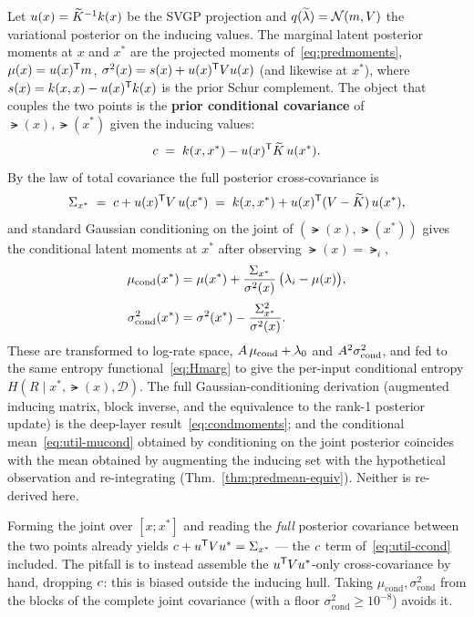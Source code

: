 Let $u(x)=\widetilde{K}^{-1}k(x)$ be the SVGP projection and $q(\widetilde{\lambda})=\mathcal{N}(m,V)$
the variational posterior on the inducing values. The marginal latent posterior
moments at $x$ and $x^{*}$ are the projected moments of~\eqref{eq:predmoments},
$\mu(x)=u(x)^{\mathsf{T}}m$, $\sigma^{2}(x)=s(x)+u(x)^{\mathsf{T}}Vu(x)$
(and likewise at $x^{*}$), where $s(x)=k(x,x)-u(x)^{\mathsf{T}}k(x)$ is
the prior Schur complement. The object that couples the two points is the
\textbf{prior conditional covariance} of $\lat(x),\lat(x^{*})$ given the inducing
values:
%
\begin{equation}
  c \;=\; k(x,x^{*}) - u(x)^{\mathsf{T}}\widetilde{K}\,u(x^{*}) .
  \label{eq:util-ccond}
\end{equation}
%
By the law of total covariance the full posterior cross-covariance is
%
\begin{equation}
  \Sigma_{x^{*}} \;=\; c + u(x)^{\mathsf{T}}V\,u(x^{*})
             \;=\; k(x,x^{*}) + u(x)^{\mathsf{T}}(V-\widetilde{K})\,u(x^{*}) ,
  \label{eq:util-crosscov}
\end{equation}
%
and standard Gaussian conditioning on the joint of
$(\lat(x),\lat(x^{*}))$ gives the conditional latent moments at $x^{*}$ after
observing $\lat(x)=\lat_i$,
%
\begin{align}
  \mu_{\mathrm{cond}}(x^{*})     &= \mu(x^{*}) + \frac{\Sigma_{x^{*}}}{\sigma^{2}(x)}\,\big(\lambda_i-\mu(x)\big),
    \label{eq:util-mucond}\\[2pt]
  \sigma^{2}_{\mathrm{cond}}(x^{*}) &= \sigma^{2}(x^{*}) - \frac{\Sigma_{x^{*}}^{2}}{\sigma^{2}(x)} .
    \label{eq:util-sigcond}
\end{align}
%
These are transformed to log-rate space, $A\,\mu_{\mathrm{cond}}+\lambda_{0}$ and
$A^{2}\sigma^{2}_{\mathrm{cond}}$, and fed to the same entropy
functional~\eqref{eq:Hmarg} to give the per-input conditional entropy
$H(R\mid x^{*},\lat(x),\mathcal D)$. The full Gaussian-conditioning derivation
(augmented inducing matrix, block inverse, and the equivalence to the rank-1
posterior update) is the deep-layer result~\eqref{eq:condmoments}; and the
conditional mean~\eqref{eq:util-mucond} obtained by conditioning on the joint
posterior coincides with the mean obtained by augmenting the inducing set with the
hypothetical observation and re-integrating (Thm.~\ref{thm:predmean-equiv}). Neither
is re-derived here.

\begin{remark}\label{rem:cond-correct}
Forming the joint over $[x;x^{*}]$ and reading the \emph{full} posterior covariance
between the two points already yields $c+u^{\mathsf{T}}Vu^{*}=\Sigma_{x^{*}}$
--- the $c$ term of~\eqref{eq:util-ccond} included. The pitfall is to instead
assemble the $u^{\mathsf{T}}Vu^{*}$-only cross-covariance by hand, dropping
$c$: this is biased outside the inducing hull. Taking
$\mu_{\mathrm{cond}},\sigma^{2}_{\mathrm{cond}}$ from the blocks of the complete
joint covariance (with a floor $\sigma^{2}_{\mathrm{cond}}\ge10^{-8}$) avoids it.
\end{remark}

